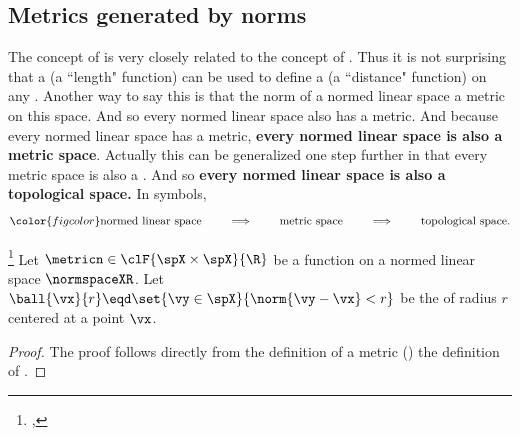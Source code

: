 \subsection{Metrics generated by norms}
The concept of  is very closely related to the concept of .
Thus it is not surprising that a  (a ``length" function)
can be used to define a  (a ``distance" function)
on any .
Another way to say this is that the norm of a normed linear space
 a metric on this space.
And %
so every normed linear space also has a metric.
And because every normed linear space has a metric,
{\bf every normed linear space is also a metric space}.
Actually this can be generalized one step further in that
every metric space is also a .
And so {\bf every normed linear space is also a topological space.}
In symbols,
\[ \color{figcolor}
   \text{normed linear space}
   \qquad\implies\qquad
   \text{metric space}
   \qquad\implies\qquad
   \text{topological space}.
\]
\begin{theorem}
\label{thm:d=norm}
\footnote{
  ,
  }
Let $\metricn\in\clF{\spX\times\spX}{\R}$ be a function on a  normed linear space $\normspaceXR$.
Let $\ball{\vx}{r}\eqd\set{\vy\in\spX}{\norm{\vy-\vx}<r}$ be the  of radius $r$ centered at a point $\vx$.
\end{theorem}
\begin{proof}
The proof follows directly from the definition of a metric ()
the definition of  .
\end{proof}

